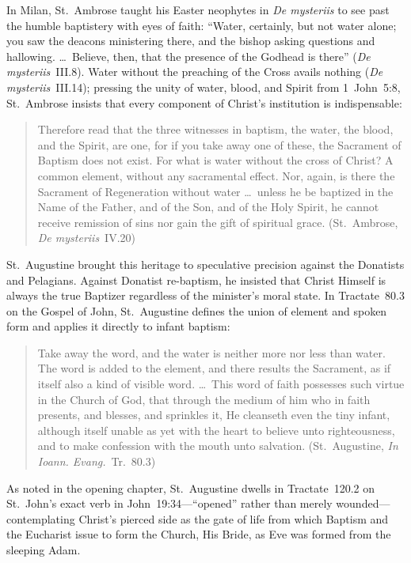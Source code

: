 In Milan, St.~Ambrose taught his Easter neophytes in \emph{De mysteriis} to see past the humble baptistery with eyes of faith: ``Water, certainly, but not water alone; you saw the deacons ministering there, and the bishop asking questions and hallowing. \dots\ Believe, then, that the presence of the Godhead is there'' (\emph{De mysteriis}~III.8). Water without the preaching of the Cross avails nothing (\emph{De mysteriis}~III.14); pressing the unity of water, blood, and Spirit from 1~John~5:8, St.~Ambrose insists that every component of Christ's institution is indispensable:
\begin{quotation}
Therefore read that the three witnesses in baptism, the water, the blood, and the Spirit, are one, for if you take away one of these, the Sacrament of Baptism does not exist. For what is water without the cross of Christ? A common element, without any sacramental effect. Nor, again, is there the Sacrament of Regeneration without water \dots\ unless he be baptized in the Name of the Father, and of the Son, and of the Holy Spirit, he cannot receive remission of sins nor gain the gift of spiritual grace. (St.~Ambrose, \emph{De mysteriis}~IV.20)
\end{quotation}

St.~Augustine brought this heritage to speculative precision against the Donatists and Pelagians. Against Donatist re-baptism, he insisted that Christ Himself is always the true Baptizer regardless of the minister's moral state. In Tractate~80.3 on the Gospel of John, St.~Augustine defines the union of element and spoken form and applies it directly to infant baptism:
\begin{quotation}
Take away the word, and the water is neither more nor less than water. The word is added to the element, and there results the Sacrament, as if itself also a kind of visible word. \dots\ This word of faith possesses such virtue in the Church of God, that through the medium of him who in faith presents, and blesses, and sprinkles it, He cleanseth even the tiny infant, although itself unable as yet with the heart to believe unto righteousness, and to make confession with the mouth unto salvation. (St.~Augustine, \emph{In Ioann. Evang.}~Tr.~80.3)
\end{quotation}
As noted in the opening chapter, St.~Augustine dwells in Tractate~120.2 on St.~John's exact verb in John~19:34---``opened'' rather than merely wounded---contemplating Christ's pierced side as the gate of life from which Baptism and the Eucharist issue to form the Church, His Bride, as Eve was formed from the sleeping Adam.

